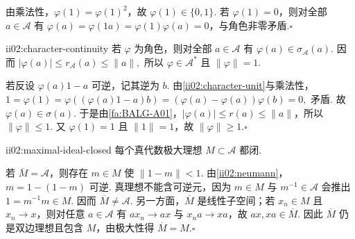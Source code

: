 \begin{FAProof}
由乘法性，\(\displaystyle\varphi(1)=\varphi(1)^2\)，故 \(\displaystyle\varphi(1)\in\{0,1\}\). 若 \(\displaystyle\varphi(1)=0\)，则对全部 \(\displaystyle a\in\mathcal A\) 有 \(\displaystyle\varphi(a)=\varphi(1a)=\varphi(1)\varphi(a)=0\)，与角色非零矛盾.\hfill\(\square\)
\end{FAProof}

\begin{FAProposition}[B][角色值属于谱与自动连续性]{ii02:character-continuity}
若 \(\displaystyle\varphi\) 为角色，则对全部 \(\displaystyle a\in\mathcal A\) 有 \(\displaystyle\varphi(a)\in\sigma_{\mathcal A}(a)\). 因而
\(\displaystyle |\varphi(a)|\leqslant r_{\mathcal A}(a)\leqslant\|a\|,\)
所以 \(\displaystyle\varphi\in\mathcal A^*\) 且 \(\displaystyle\|\varphi\|=1\).
\end{FAProposition}

\begin{FAProof}
若反设 \(\displaystyle\varphi(a)1-a\) 可逆，记其逆为 \(\displaystyle b\). 由\autoref{ii02:character-unit}与乘法性，
\(\displaystyle 1 =\varphi(1) =\varphi((\varphi(a)1-a)b) =(\varphi(a)-\varphi(a))\varphi(b) =0,\)
矛盾. 故 \(\displaystyle\varphi(a)\in\sigma(a)\). 于是由\autoref{fa:BALG-A01}，\(\displaystyle|\varphi(a)|\leqslant r(a)\leqslant\|a\|\)，所以 \(\displaystyle\|\varphi\|\leqslant1\). 又 \(\displaystyle\varphi(1)=1\) 且 \(\displaystyle\|1\|=1\)，故 \(\displaystyle\|\varphi\|\geqslant1\).\hfill\(\square\)
\end{FAProof}

\begin{FALemma}[B][代数极大理想自动闭]{ii02:maximal-ideal-closed}
每个真代数极大理想 \(\displaystyle M\subset\mathcal A\) 都闭.
\end{FALemma}

\begin{FAProof}
若 \(\displaystyle\overline M=\mathcal A\)，则存在 \(\displaystyle m\in M\) 使 \(\displaystyle\|1-m\|<1\). 由\autoref{ii02:neumann}，\(\displaystyle m=1-(1-m)\) 可逆. 真理想不能含可逆元，因为 \(\displaystyle m\in M\) 与 \(\displaystyle m^{-1}\in\mathcal A\) 会推出 \(\displaystyle1=m^{-1}m\in M\). 因而 \(\displaystyle\overline M\neq\mathcal A\). 另一方面，\(\displaystyle\overline M\) 是线性子空间；若 \(\displaystyle x_n\in M\) 且 \(\displaystyle x_n\to x\)，则对任意 \(\displaystyle a\in\mathcal A\) 有 \(\displaystyle ax_n\to ax\) 与 \(\displaystyle x_na\to xa\)，故 \(\displaystyle ax,xa\in\overline M\). 因此 \(\displaystyle\overline M\) 仍是双边理想且包含 \(\displaystyle M\)，由极大性得 \(\displaystyle\overline M=M\).\hfill\(\square\)
\end{FAProof}

